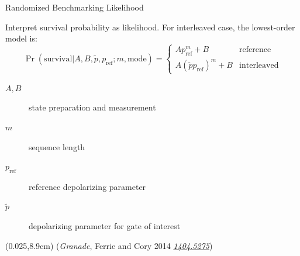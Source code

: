 \documentclass[xcolor=dvipsnames, compress]{beamer}
\renewcommand\UrlFont{\color{red}\rmfamily\itshape}
\newcommand{\arxiv}[1]{\href{https://scirate.com/arxiv/#1}{\UrlFont #1}}
\newcommand{\dd}{\mathrm{d}}
\newcommand{\expect}{\mathbb{E}}
\newcommand{\bottomnote}[1]{
  \begin{textblock*}{0.95\paperwidth} (0.025\paperwidth,8.9cm)
    {\tiny \hfill #1}
  \end{textblock*}
}
\begin{document}
\begin{frame}{Randomized Benchmarking Likelihood}

  Interpret survival probability as likelihood.
  For interleaved case, the lowest-order model is:
  \[
    \Pr(\text{survival} | A, B, \tilde{p}, p_{\text{ref}}; m, \text{mode}) =
    \begin{cases}
      A p_{\text{ref}}^m + B & \text{reference} \\
      A (\tilde{p} p_{\text{ref}})^m + B & \text{interleaved}
    \end{cases}
  \]

  \begin{description}
    \item[$A,B$] state preparation and measurement
    \item[$m$] sequence length
    \item[$p_{\text{ref}}$] reference depolarizing parameter
    \item[$\tilde{p}$] depolarizing parameter for gate of interest
  \end{description}


  \bottomnote{(\emph{Granade}, Ferrie and Cory 2014 \arxiv{1404.5275})}

\end{frame}


\end{document}
